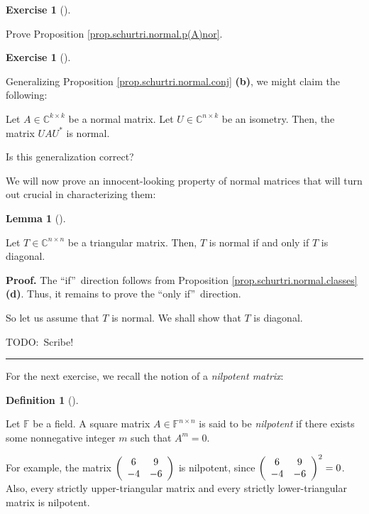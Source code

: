 \documentclass[numbers=enddot,12pt,final,onecolumn,notitlepage]{scrartcl}%
\newcounter{exer}
\numberwithin{exer}{subsection}
\theoremstyle{definition}
\newtheorem{lem}[theo]{Lemma}
\newenvironment{lemma}[1][]
{\begin{lem}[#1]\begin{leftbar}}
{\end{leftbar}\end{lem}}
\newtheorem{defi}[theo]{Definition}
\newenvironment{definition}[1][]
{\begin{defi}[#1]\begin{leftbar}}
{\end{leftbar}\end{defi}}
\newtheorem{exmp}[exer]{Exercise}
\newenvironment{exercise}[1][]
{\begin{exmp}[#1]\begin{leftbar}}
{\end{leftbar}\end{exmp}}
\newenvironment{proof}[1][Proof]{\noindent\textbf{#1.} }{\ \rule{0.5em}{0.5em}}
\begin{document}
\begin{exercise}
\label{exe.schurtri.normal.p(A)nor} Prove Proposition
\ref{prop.schurtri.normal.p(A)nor}.
\end{exercise}

\begin{exercise}
\label{exe.schurtri.normal.isometry} Generalizing Proposition
\ref{prop.schurtri.normal.conj} \textbf{(b)}, we might claim the following:

Let $A\in\mathbb{C}^{k\times k}$ be a normal matrix. Let $U\in\mathbb{C}%
^{n\times k}$ be an isometry. Then, the matrix $UAU^{\ast}$ is normal.

Is this generalization correct?
\end{exercise}

We will now prove an innocent-looking property of normal matrices that will
turn out crucial in characterizing them:

\begin{lemma}
\label{lem.schurtri.normal.tri}Let $T\in\mathbb{C}^{n\times n}$ be a
triangular matrix. Then, $T$ is normal if and only if $T$ is diagonal.
\end{lemma}

\begin{proof}
The \textquotedblleft if\textquotedblright\ direction follows from Proposition
\ref{prop.schurtri.normal.classes} \textbf{(d)}. Thus, it remains to prove the
\textquotedblleft only if\textquotedblright\ direction.

So let us assume that $T$ is normal. We shall show that $T$ is diagonal.

TODO:\ Scribe!
\end{proof}

For the next exercise, we recall the notion of a \emph{nilpotent matrix}:

\begin{definition}
Let $\mathbb{F}$ be a field. A square matrix $A\in\mathbb{F}^{n\times n}$ is
said to be \emph{nilpotent} if there exists some nonnegative integer $m$ such
that $A^{m}=0$.
\end{definition}

For example, the matrix $\left(
\begin{array}
[c]{cc}%
6 & 9\\
-4 & -6
\end{array}
\right)  $ is nilpotent, since $\left(
\begin{array}
[c]{cc}%
6 & 9\\
-4 & -6
\end{array}
\right)  ^{2}=0$. Also, every strictly upper-triangular matrix and every
strictly lower-triangular matrix is nilpotent.
\end{document}
